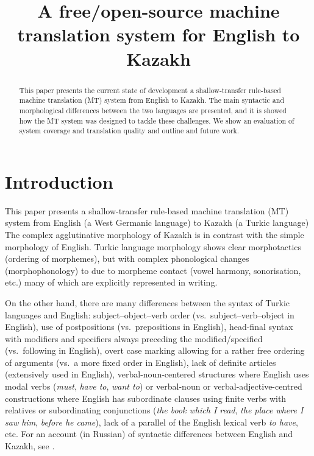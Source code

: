 \documentclass[11pt]{article}
\title{A free/open-source machine translation system for English to Kazakh}
\date{}
\begin{document}
\maketitle 
 

\begin{abstract}
This paper presents the current state of development a shallow-transfer rule-based machine translation (MT) system from English to Kazakh. The main syntactic and morphological differences 
between the two languages are presented, and it is showed how the MT 
system was designed to tackle these challenges. We show an evaluation of system coverage and 
translation quality and outline and future work.
\end{abstract}

\section{Introduction}

This paper presents a shallow-transfer rule-based machine translation (MT) system from English 
(a West Germanic language) to Kazakh (a Turkic language)
The complex agglutinative morphology of Kazakh 
is in contrast with the simple morphology of English.
Turkic language morphology shows clear morphotactics (ordering of morphemes), but with 
complex phonological changes (morphophonology) to due to morpheme contact (vowel harmony, 
sonorisation, etc.) many of which are explicitly represented in writing.

On the other hand, there are many differences between the syntax of Turkic languages 
and English: subject–object–verb order (vs.\ subject–verb–object in English), use of 
postpositions (vs.\ prepositions in English), head-final syntax with modifiers and specifiers 
always preceding the modified/specified (vs.\ following in English), overt case marking allowing 
for a rather free ordering of arguments (vs.\ a more fixed order in English), lack of definite 
articles (extensively used in English), verbal-noun-centered structures where English uses modal 
verbs (\emph{must}, \emph{have to}, \emph{want to}) or verbal-noun or verbal-adjective-centred constructions where 
English has subordinate clauses using finite verbs with relatives or subordinating 
conjunctions (\emph{the book which I read}, \emph{the place where I saw him}, \emph{before he came}), lack of a parallel 
of the English lexical verb \emph{to have}, etc. For an account (in Russian) of 
syntactic differences between English and Kazakh, see \cite{pecherskih2012}.
\end{document}
